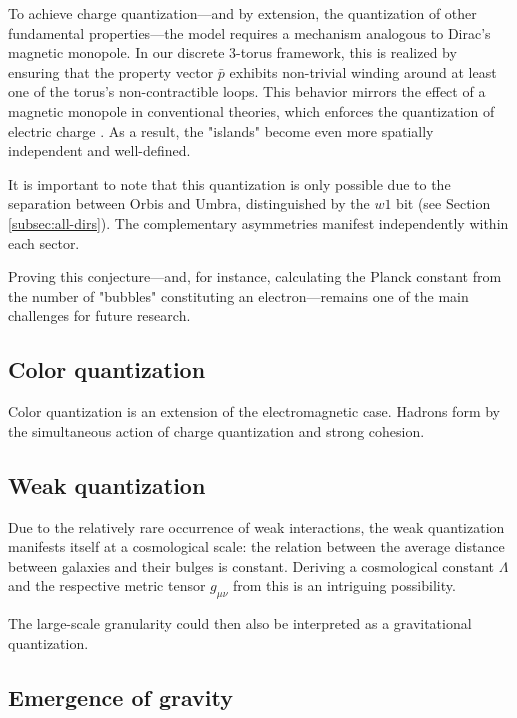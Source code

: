 \documentclass[12pt,english]{article}
\begin{document}
To achieve charge quantization—and by extension, the quantization of other fundamental properties—the model requires a mechanism analogous to Dirac's magnetic monopole. In our discrete 3-torus framework, this is realized by ensuring that the property vector $\bar{p}$ exhibits non-trivial winding around at least one of the torus’s non-contractible loops. This behavior mirrors the effect of a magnetic monopole in conventional theories, which enforces the quantization of electric charge \cite{dirac1931}. As a result, the "islands" become even more spatially independent and well-defined.

It is important to note that this quantization is only possible due to the separation between Orbis and Umbra, distinguished by the $w1$ bit (see Section \ref{subsec:all-dirs}). The complementary asymmetries manifest independently within each sector.

Proving this conjecture—and, for instance, calculating the Planck constant from the number of "bubbles" constituting an electron—remains one of the main challenges for future research.

\subsection{Color quantization}
Color quantization is an extension of the electromagnetic case. Hadrons form by the simultaneous action of charge quantization and strong cohesion.

\subsection{Weak quantization}
Due to the relatively rare occurrence of weak interactions, the weak quantization manifests itself at a cosmological scale: the relation between the average distance between galaxies and their bulges is constant. Deriving a cosmological constant $\Lambda$ and the respective metric tensor $g_{\mu\nu}$ from this is an intriguing possibility. 

The large-scale granularity could then also be interpreted as a gravitational quantization.

\subsection{Emergence of gravity}\label{subsec:emergence-of-gravity}
\end{document}
